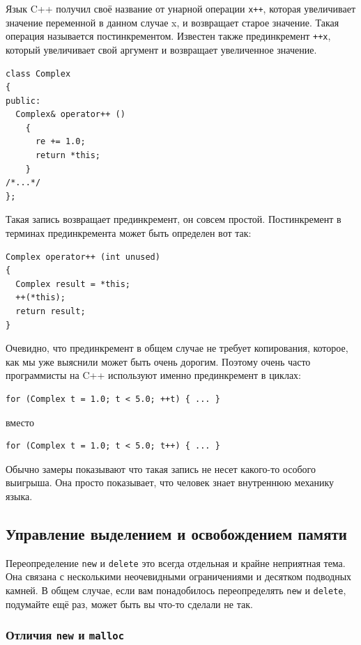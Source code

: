 \documentclass[a4paper,12pt,oneside]{article}
\begin{document}
Язык C++ получил своё название от унарной операции \lstinline!x++!, которая увеличивает значение переменной в данном случае x, и возвращает старое значение. Такая операция называется постинкрементом. Известен также прединкремент \lstinline!++x!, который увеличивает свой аргумент и возвращает увеличенное значение.

\begin{lstlisting}
class Complex
{
public:
  Complex& operator++ ()
    {
      re += 1.0;
      return *this;      
    }
/*...*/
};
\end{lstlisting}

Такая запись возвращает прединкремент, он совсем простой. Постинкремент в терминах прединкремента может быть определен вот так:

\begin{lstlisting}
Complex operator++ (int unused)
{
  Complex result = *this;
  ++(*this);
  return result;
} 
\end{lstlisting}

Очевидно, что прединкремент в общем случае не требует копирования, которое, как мы уже выяснили может быть очень дорогим. Поэтому очень часто программисты на C++ используют именно прединкремент в циклах:

\begin{lstlisting}
for (Complex t = 1.0; t < 5.0; ++t) { ... }
\end{lstlisting}

вместо

\begin{lstlisting}
for (Complex t = 1.0; t < 5.0; t++) { ... }
\end{lstlisting}

Обычно замеры показывают что такая запись не несет какого-то особого выигрыша. Она просто показывает, что человек знает внутреннюю механику языка.

\subsection{Управление выделением и освобождением памяти}\label{MemManage}

Переопределение \lstinline!new! и \lstinline!delete! это всегда отдельная и крайне неприятная тема. Она связана с несколькими неочевидными ограничениями и десятком подводных камней. В общем случае, если вам понадобилось переопределять \lstinline!new! и \lstinline!delete!, подумайте ещё раз, может быть вы что-то сделали не так.

\subsubsection{Отличия \lstinline!new! и \lstinline!malloc!}
\end{document}
